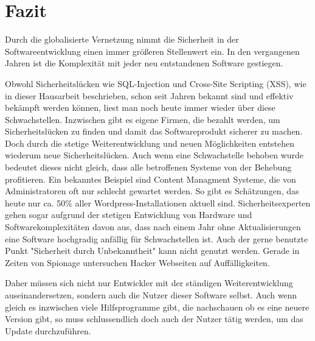 \section{Fazit}
Durch die globalisierte Vernetzung nimmt die Sicherheit in der 
Softwareentwicklung einen immer größeren Stellenwert ein. In den 
vergangenen Jahren ist die Komplexität mit jeder neu entstandenen 
Software gestiegen. 
\newline


Obwohl Sicherheitslücken wie SQL-Injection und Cross-Site Scripting (XSS), 
wie in dieser Hausarbeit beschrieben, schon seit Jahren bekannt sind und 
effektiv bekämpft werden können, liest man noch heute immer wieder über diese 
Schwachstellen. Inzwischen gibt es eigene Firmen, die bezahlt werden, um 
Sicherheitslücken zu finden und damit das Softwareprodukt sicherer zu 
machen. Doch durch die stetige Weiterentwicklung und neuen Möglichkeiten
entstehen wiederum neue Sicherheitslücken.
Auch wenn eine Schwachstelle behoben wurde bedeutet dieses nicht gleich, 
dass alle betroffenen Systeme von der Behebung profitieren.
Ein bekanntes Beispiel sind Content Managment Systeme, die von
Administratoren oft nur schlecht gewartet werden. So gibt es Schätzungen,
das heute nur ca. 50\% aller Wordpress-Installationen \cite{playground_wordpress} %
aktuell sind. Sicherheitsexperten gehen sogar aufgrund der stetigen
Entwicklung von Hardware und Softwarekomplexitäten davon aus, dass 
nach einem Jahr ohne Aktualisierungen eine Software hochgradig
anfällig für Schwachstellen ist.
Auch der gerne benutzte Punkt "Sicherheit durch Unbekanntheit" 
kann nicht genutzt werden. Gerade in Zeiten von Spionage untersuchen
Hacker Webseiten auf Auffälligkeiten.
 
Daher müssen sich nicht nur Entwickler mit der ständigen Weiterentwicklung 
auseinandersetzen, sondern auch die Nutzer dieser Software selbst. 
Auch wenn gleich es inzwischen viele Hilfsprogramme gibt, die nachschauen 
ob es eine neuere Version gibt, so muss schlussendlich doch auch der 
Nutzer tätig werden, um das Update durchzuführen.   
